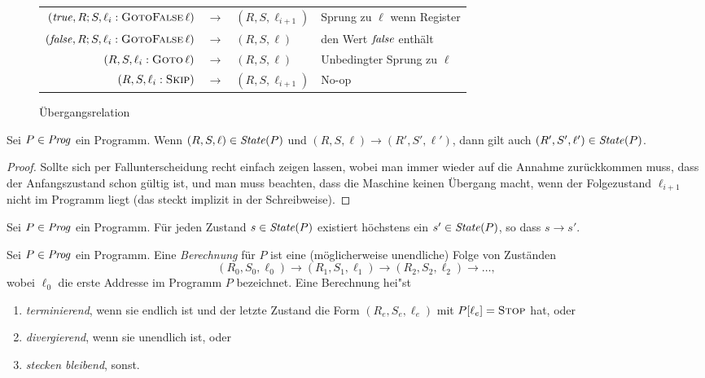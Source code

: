 \documentclass[12pt,fleqn]{article}
\begin{document}
\begin{figure}
{\begin{center}
\begin{tabular}{|rcl|l|}
      $({\text{\it true\/}},R;S,\ell_i:\textsc{GotoFalse}\,\ell)$ & $\to$ & $(R,S,\ell_{i+1})$ & Sprung zu $\ell$ wenn Register \\
      $({\text{\it false\/}},R;S,\ell_i:\textsc{GotoFalse}\,\ell)$ & $\to$ & $(R,S,\ell)$ & den Wert ${\text{\it false\/}}$ enth\"alt \\
      $(R,S,\ell_i:\textsc{Goto}\,\ell)$ & $\to$ & $(R,S,\ell)$ & Unbedingter Sprung zu $\ell$ \\
      $(R,S,\ell_i:\textsc{Skip})$ & $\to$ & $(R,S,\ell_{i+1})$ & No-op \\
      \hline
    \end{tabular}
  \end{center}}
  \caption{\"Ubergangsrelation}
  \label{table:CAM_Reductions}
\end{figure}

\begin{lemma}
  Sei $P\in{\text{\it Prog\/}}$ ein Programm. Wenn $(R,S,\ell)\in{\text{\it State\/}}(P)$ und $(R,S,\ell) \to (R',S',\ell')$, dann gilt auch
  $(R',S',\ell')\in{\text{\it State\/}}(P)$.
\end{lemma}

\begin{proof}
  Sollte sich per Fallunterscheidung recht einfach zeigen lassen, wobei man immer wieder auf die Annahme zur\"uckkommen
  muss, dass
  der Anfangszustand schon g\"ultig ist, und man muss beachten, dass die Maschine keinen \"Ubergang macht, wenn
  der Folgezustand $\ell_{i+1}$ nicht im Programm liegt (das steckt implizit in der Schreibweise).
\end{proof}

\begin{lemma}
  Sei $P\in{\text{\it Prog\/}}$ ein Programm. F\"ur jeden Zustand $s\in{\text{\it State\/}}(P)$ existiert h\"ochstens ein $s'\in{\text{\it State\/}}(P)$, so
  dass $s \to s'$.
\end{lemma}

\begin{definition}[Berechnung]
  Sei $P\in{\text{\it Prog\/}}$ ein Programm. Eine {\em Berechnung} f\"ur $P$ ist eine (m\"oglicherweise unendliche) Folge von
  Zust\"anden
  \[
  (R_0,S_0,\ell_0) \to (R_1,S_1,\ell_1) \to (R_2,S_2,\ell_2) \to \ldots,
  \]
  wobei $\ell_0$ die erste Addresse im Programm $P$ bezeichnet. Eine Berechnung hei"st
  \begin{enumerate}
    \item {\em terminierend}, wenn sie endlich ist und der letzte Zustand die Form $(R_e,S_e,\ell_e)$
      mit $P[\ell_e] = \textsc{Stop}$ hat, oder
    \item {\em divergierend}, wenn sie unendlich ist, oder
    \item {\em stecken bleibend}, sonst.
  \end{enumerate}
\end{definition}
\end{document}
